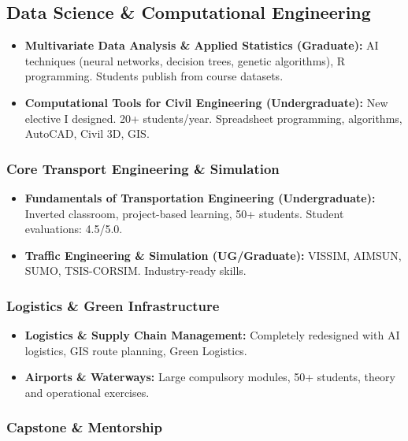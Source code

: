 \documentclass[
  10pt,
  a4paper,
  DIV=11,
  numbers=noendperiod]{scrartcl}
\providecommand{\tightlist}{%
  \setlength{\itemsep}{0pt}\setlength{\parskip}{0pt}}
\begin{document}
\subsection{Data Science \& Computational
Engineering}\label{data-science-computational-engineering}

\begin{itemize}
\tightlist
\item
  \textbf{Multivariate Data Analysis \& Applied Statistics (Graduate):}
  AI techniques (neural networks, decision trees, genetic algorithms), R
  programming. Students publish from course datasets.
\item
  \textbf{Computational Tools for Civil Engineering (Undergraduate):}
  New elective I designed. 20+ students/year. Spreadsheet programming,
  algorithms, AutoCAD, Civil 3D, GIS.
\end{itemize}

\subsubsection{Core Transport Engineering \&
Simulation}\label{core-transport-engineering-simulation}

\begin{itemize}
\tightlist
\item
  \textbf{Fundamentals of Transportation Engineering (Undergraduate):}
  Inverted classroom, project-based learning, 50+ students. Student
  evaluations: 4.5/5.0.
\item
  \textbf{Traffic Engineering \& Simulation (UG/Graduate):} VISSIM,
  AIMSUN, SUMO, TSIS-CORSIM. Industry-ready skills.
\end{itemize}

\subsubsection{Logistics \& Green
Infrastructure}\label{logistics-green-infrastructure}

\begin{itemize}
\tightlist
\item
  \textbf{Logistics \& Supply Chain Management:} Completely redesigned
  with AI logistics, GIS route planning, Green Logistics.
\item
  \textbf{Airports \& Waterways:} Large compulsory modules, 50+
  students, theory and operational exercises.
\end{itemize}

\subsubsection{Capstone \& Mentorship}\label{capstone-mentorship}
\end{document}
